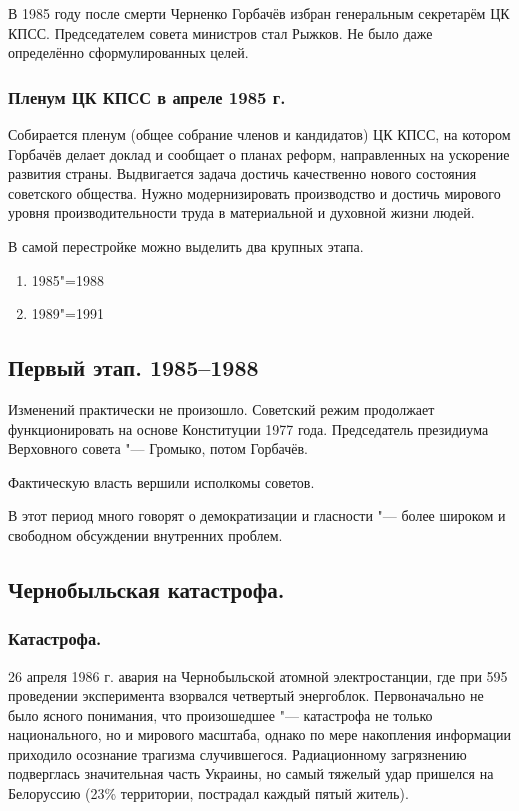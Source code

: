 В 1985 году после смерти Черненко Горбачёв избран генеральным секретарём ЦК КПСС. Председателем совета министров стал Рыжков. Не было даже определённо сформулированных целей.

\subsubsection{\textbf{Пленум ЦК КПСС в апреле 1985 г.}}

Собирается пленум (общее собрание членов и кандидатов) ЦК КПСС, на котором Горбачёв делает доклад и сообщает о планах реформ, направленных на ускорение развития страны. Выдвигается задача достичь качественно нового состояния советского общества. Нужно модернизировать производство и достичь мирового уровня производительности труда в материальной и духовной жизни людей.

В самой перестройке можно выделить два крупных этапа.

\begin{enumerate}
    \item 1985"=1988
    \item 1989"=1991
\end{enumerate}

\subsection{Первый этап. 1985--1988}

Изменений практически не произошло. Советский режим продолжает функционировать на основе Конституции 1977 года. Председатель президиума Верховного совета "--- Громыко, потом Горбачёв.

Фактическую власть вершили исполкомы советов.

В этот период много говорят о демократизации и гласности "--- более широком и свободном обсуждении внутренних проблем.

\subsection{Чернобыльская катастрофа.}

\subsubsection{\textbf{Катастрофа.}}

26 апреля 1986 г. авария на Чернобыльской атомной электростанции, где при 595 проведении эксперимента взорвался четвертый энергоблок. Первоначально не было ясного понимания, что произошедшее "--- катастрофа не только национального, но и мирового масштаба, однако по мере накопления информации приходило осознание трагизма случившегося. Радиационному загрязнению подверглась значительная часть Украины, но самый тяжелый удар пришелся на Белоруссию (23\% территории, пострадал каждый пятый житель).

